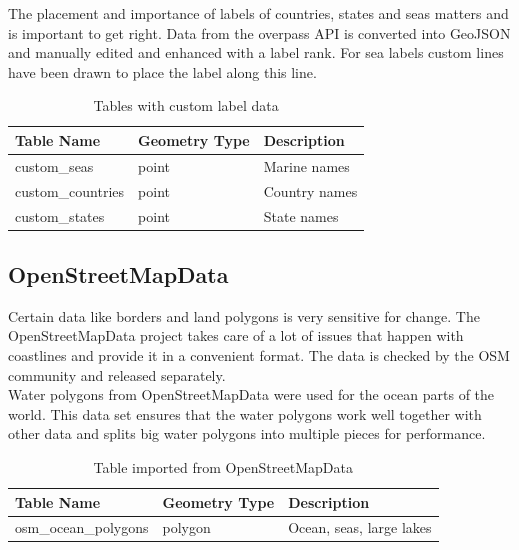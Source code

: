 The placement and importance of labels of countries, states and seas matters\cite{12_axismaps.github.io_2015} and is important to get right. Data from the overpass API \cite{13_wiki.openstreetmap.org_2015} is converted into GeoJSON and
manually edited and enhanced with a label rank. For sea labels custom lines have been drawn to place the label along this line.

\begin{table}[H]
\centering
    \begin{tabular}{lll}
    \hline
    Table Name   & Geometry Type & Description \\
    \hline                                          
    custom\_seas       & point    & Marine names \\
    custom\_countries    & point    & Country names \\
    custom\_states       & point    & State names \\
    \end{tabular}
    \caption{Tables with custom label data}
\end{table}

\subsection{OpenStreetMapData}

Certain \osm{} data like borders and land polygons is very sensitive for change.
The OpenStreetMapData\cite{14_openstreetmapdata.com_2015}
project takes care of a lot of issues that happen with coastlines
and provide it in a convenient format. The data is checked by the OSM community
and released separately.
\\
Water polygons\cite{15_openstreetmapdata.com_2015} from OpenStreetMapData were used for the ocean parts of the world. This data set ensures that the water polygons
work well together with other \osm{} data and splits big water polygons into multiple 
pieces for performance.

\begin{table}[H]
\centering
    \begin{tabular}{lll}
    \hline
    Table Name            & Geometry Type & Description \\
    \hline
    osm\_ocean\_polygons        & polygon       & Ocean, seas, large lakes           \\
    \end{tabular}
    \caption{Table imported from OpenStreetMapData}
\end{table}

